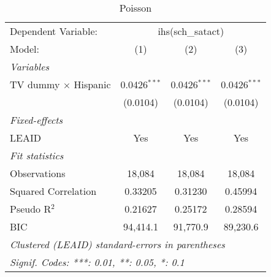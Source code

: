 \begin{table}[htbp]
\centering
\caption{Poisson}
\begin{tabular}{lccc}
\tabularnewline\midrule\midrule
Dependent Variable:&\multicolumn{3}{c}{ihs(sch\_satact)}\\
Model:&(1) & (2) & (3)\\
\midrule \emph{Variables}&   &   &  \\
TV dummy $\times$ Hispanic & 0.0426$^{***}$ & 0.0426$^{***}$ & 0.0426$^{***}$\\
  &(0.0104) & (0.0104) & (0.0104)\\
\midrule \emph{Fixed-effects}&   &   &  \\
LEAID & Yes & Yes & Yes\\
\midrule \emph{Fit statistics}&  & & \\
Observations & 18,084&18,084&18,084\\
Squared Correlation & 0.33205&0.31230&0.45994\\
Pseudo R$^2$ & 0.21627&0.25172&0.28594\\
BIC & 94,414.1&91,770.9&89,230.6\\
\midrule\midrule\multicolumn{4}{l}{\emph{Clustered (LEAID) standard-errors in parentheses}}\\
\multicolumn{4}{l}{\emph{Signif. Codes: ***: 0.01, **: 0.05, *: 0.1}}\\
\end{tabular}
\end{table}

